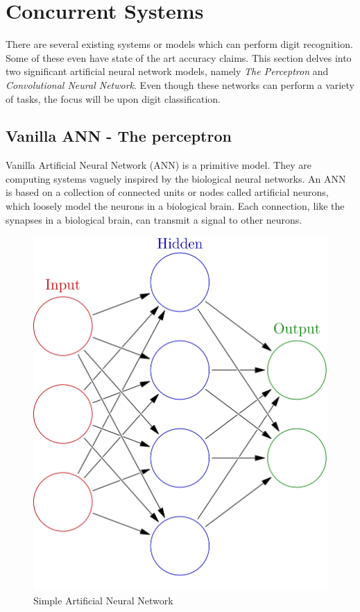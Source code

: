 \documentclass[12pt, a4paper]{report}
\begin{document}
\chapter{Concurrent Systems}
\label{chap:existing}
\thispagestyle{fancy}

\hspace{0.5cm} There are several existing systems or models which can perform digit recognition. Some of these even have state of the art accuracy claims. This section delves into two significant artificial neural network models, namely \emph{The Perceptron} and \emph{Convolutional Neural Network}. Even though these networks can perform a variety of tasks, the focus will be upon digit classification.

\section{Vanilla ANN - The perceptron}
\label{sec:perceptron}

\hspace{0.5cm} Vanilla Artificial Neural Network (ANN) is a primitive model. They are computing systems vaguely inspired by the biological neural networks. An ANN is based on a collection of connected units or nodes called artificial neurons, which loosely model the neurons in a biological brain. Each connection, like the synapses in a biological brain, can transmit a signal to other neurons.

\begin{figure}[!htbp]
    \centering
    \includegraphics[height=0.5\textwidth]{artificial_neural_network.png}
    \caption[Simple Artificial Neural Network]{Simple Artificial Neural Network \cite{wiki:anns}}
    \label{fig:5.1}
\end{figure}
\end{document}
